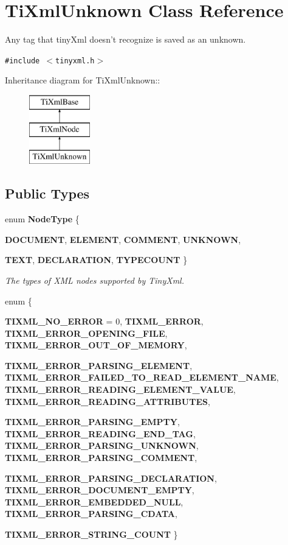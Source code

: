 \section{Ti\-Xml\-Unknown Class Reference}
\label{classTiXmlUnknown}
Any tag that tiny\-Xml doesn't recognize is saved as an unknown.  


{\tt \#include $<$tinyxml.h$>$}

Inheritance diagram for Ti\-Xml\-Unknown::\begin{figure}[H]
\begin{center}
\leavevmode
\includegraphics[height=3cm]{classTiXmlUnknown}
\end{center}
\end{figure}
\subsection*{Public Types}
\begin{CompactItemize}
\item 
enum {\bf Node\-Type} \{ \par
{\bf DOCUMENT}, 
{\bf ELEMENT}, 
{\bf COMMENT}, 
{\bf UNKNOWN}, 
\par
{\bf TEXT}, 
{\bf DECLARATION}, 
{\bf TYPECOUNT}
 \}
\begin{CompactList}\small\item\em The types of XML nodes supported by Tiny\-Xml. \item\end{CompactList}\item 
enum \{ \par
{\bf TIXML\_\-NO\_\-ERROR} =  0, 
{\bf TIXML\_\-ERROR}, 
{\bf TIXML\_\-ERROR\_\-OPENING\_\-FILE}, 
{\bf TIXML\_\-ERROR\_\-OUT\_\-OF\_\-MEMORY}, 
\par
{\bf TIXML\_\-ERROR\_\-PARSING\_\-ELEMENT}, 
{\bf TIXML\_\-ERROR\_\-FAILED\_\-TO\_\-READ\_\-ELEMENT\_\-NAME}, 
{\bf TIXML\_\-ERROR\_\-READING\_\-ELEMENT\_\-VALUE}, 
{\bf TIXML\_\-ERROR\_\-READING\_\-ATTRIBUTES}, 
\par
{\bf TIXML\_\-ERROR\_\-PARSING\_\-EMPTY}, 
{\bf TIXML\_\-ERROR\_\-READING\_\-END\_\-TAG}, 
{\bf TIXML\_\-ERROR\_\-PARSING\_\-UNKNOWN}, 
{\bf TIXML\_\-ERROR\_\-PARSING\_\-COMMENT}, 
\par
{\bf TIXML\_\-ERROR\_\-PARSING\_\-DECLARATION}, 
{\bf TIXML\_\-ERROR\_\-DOCUMENT\_\-EMPTY}, 
{\bf TIXML\_\-ERROR\_\-EMBEDDED\_\-NULL}, 
{\bf TIXML\_\-ERROR\_\-PARSING\_\-CDATA}, 
\par
{\bf TIXML\_\-ERROR\_\-STRING\_\-COUNT}
 \}
\end{CompactItemize}

